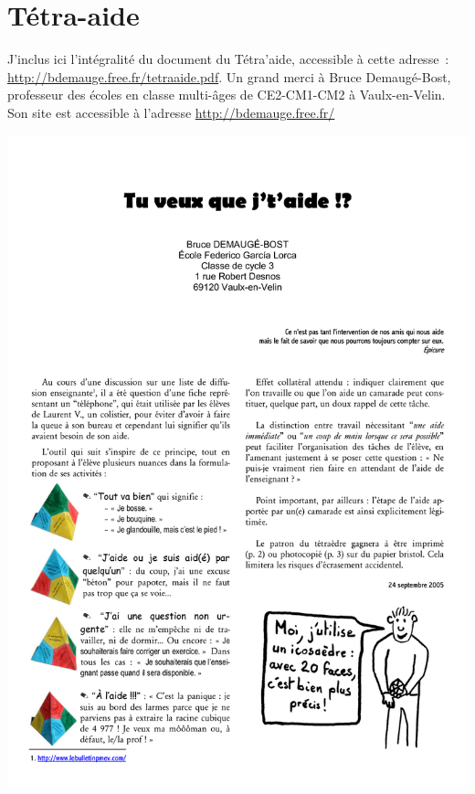 \section{Tétra-aide}
J'inclus ici l'intégralité du document du Tétra'aide, accessible à cette adresse :
\url{http://bdemauge.free.fr/tetraaide.pdf}. Un grand merci à Bruce Demaugé-Bost,
professeur des écoles en classe multi-âges de CE2-CM1-CM2 à Vaulx-en-Velin.
Son site est accessible à l'adresse \url{http://bdemauge.free.fr/}

\begin{center}
\includegraphics[scale=0.2]{annexes/01_tetraaide_0.png}

\end{center}
